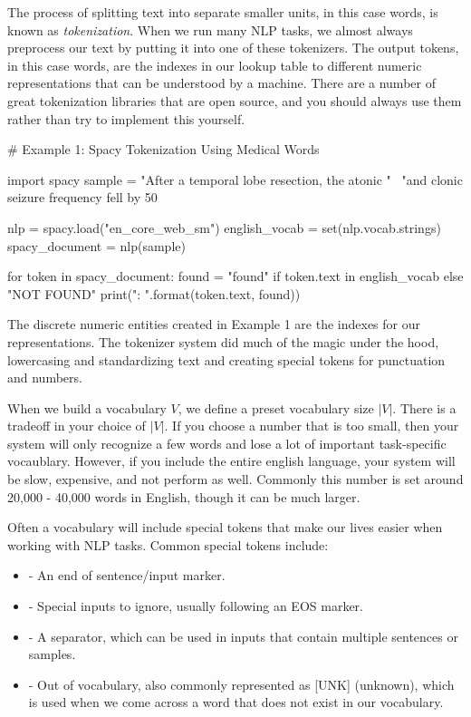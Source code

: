 The process of splitting text into separate smaller units, in this case words, is known as \textit{tokenization}. When we run many NLP tasks, we almost always preprocess our text by putting it into one of these tokenizers. The output tokens,
in this case words, are the indexes in our lookup table to different numeric representations that can be understood by a machine. There are a number of great tokenization libraries that are open source, and you should always use them rather than
try to implement this yourself.

\begin{python}
  # Example 1: Spacy Tokenization Using Medical Words

  import spacy
  sample = "After a temporal lobe resection, the atonic " \
           "and clonic seizure frequency fell by 50%

  nlp = spacy.load("en_core_web_sm")
  english_vocab = set(nlp.vocab.strings)
  spacy_document = nlp(sample)

  for token in spacy_document:
      found = "found" if token.text in english_vocab else "NOT FOUND"
      print("{}: {}".format(token.text, found))
\end{python}

The discrete numeric entities created in Example 1 are the indexes for our representations. The tokenizer system did much of the magic under the hood, lowercasing and standardizing text and creating special tokens for punctuation and numbers.

When we build a vocabulary $V$, we define a preset vocabulary size $|V|$. There is a tradeoff in your choice of $|V|$. If you choose a number that is too small, then
your system will only recognize a few words and lose a lot of important task-specific vocaublary. However, if you include the entire english language, your system will be slow, expensive, and not perform as well.
Commonly this number is set around 20,000 - 40,000 words in English, though it can be much larger.

Often a vocabulary will include special tokens that make our lives easier when working with NLP tasks. Common special tokens include:
\begin{itemize}
  \item \pythoninline{[EOS]} - An end of sentence/input marker.
  \item \pythoninline{[PAD]} - Special inputs to ignore, usually following an EOS marker.
  \item \pythoninline{[SEP]} - A separator, which can be used in inputs that contain multiple sentences or samples.
  \item \pythoninline{[OOV]} - Out of vocabulary, also commonly represented as [UNK] (unknown), which is used when we come across a word that does not exist in our vocabulary.
\end{itemize}

